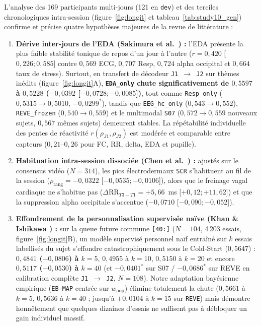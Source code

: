 \documentclass[10pt]{article}
\begin{document}
L'analyse des 169 participants multi-jours (121 en \texttt{dev}) et des terciles chronologiques intra-session (figure~\ref{fig:longit} et tableau~\ref{tab:study10_gen}) confirme et précise quatre hypothèses majeures de la revue de littérature :
\begin{enumerate}
\item \textbf{Dérive inter-jours de l'EDA (Sakimura et al.\ \cite{sakimura2025}) :} l'EDA présente la plus faible stabilité tonique de repos d'un jour à l'autre ($r = 0{,}420$ [$0{,}226 ; 0{,}585$] contre $0{,}569$ ECG, $0{,}707$ Resp, $0{,}724$ alpha occipital et $0{,}664$ taux de stress). Surtout, en transfert de décodeur \texttt{J1 $\to$ J2} sur thèmes inédits (figure~\ref{fig:longit}A), \textbf{\texttt{EDA\_only} chute significativement de $0{,}5597$ à $0{,}5228$ ($-0{,}0392$ [$-0{,}0728 ; -0{,}0085$])}, tout comme \texttt{Resp\_only} ($0{,}5315 \to 0{,}5010$, $-0{,}0299^*$), tandis que \texttt{EEG\_hc\_only} ($0{,}543 \to 0{,}552$), \texttt{REVE\_frozen} ($0{,}540 \to 0{,}559$) et le multimodal \texttt{S07} ($0{,}572 \to 0{,}559$ nouveaux sujets, $0{,}567$ mêmes sujets) demeurent stables. La répétabilité individuelle des pentes de réactivité $r(\rho_{J1}, \rho_{J2})$ est modérée et comparable entre capteurs ($0{,}21$--$0{,}26$ pour FC, RR, delta, EDA et pupille).
\item \textbf{Habituation intra-session dissociée (Chen et al.\ \cite{chen2014}) :} ajustés sur le consensus vidéo ($N = 314$), les pics électrodermaux \texttt{SCR} s'habituent au fil de la session ($\rho_{\text{rang}} = -0{,}0322$ [$-0{,}0535 ; -0{,}0106$]), alors que le freinage vagal cardiaque ne s'habitue pas ($\Delta\mathrm{RR}_{T3-T1} = +5{,}66$~ms [$+0{,}12 ; +11{,}62$]) et que la suppression alpha occipitale s'accentue ($-0{,}0710$ [$-0{,}090 ; -0{,}052$]).
\item \textbf{Effondrement de la personnalisation supervisée naïve (Khan \& Ishikawa \cite{khan2026}) :} sur la queue future commune \texttt{[40:]} ($N = 104$, 4\,203 essais, figure~\ref{fig:longit}B), un modèle supervisé personnel naïf entraîné sur $k$ essais labellisés du sujet s'effondre catastrophiquement sous le Cold-Start ($0{,}5647$) : \textbf{$0{,}4841$ ($-0{,}0806$) à $k = 5$}, $0{,}4955$ à $k = 10$, $0{,}5150$ à $k = 20$ et encore \textbf{$0{,}5117$ ($-0{,}0530$) à $k = 40$} (et $-0{,}0401^*$ sur S07 / $-0{,}0686^*$ sur REVE en calibration complète \texttt{J1 $\to$ J2}, $N = 108$). Notre adaptation bayésienne empirique (\texttt{EB-MAP} centrée sur $w_{\text{pop}}$) élimine totalement la chute ($0{,}5661$ à $k = 5$, $0{,}5636$ à $k = 40$ ; jusqu'à $+0{,}0104$ à $k = 15$ sur \texttt{REVE}) mais démontre honnêtement que quelques dizaines d'essais ne suffisent pas à débloquer un gain individuel massif.

\end{enumerate}
\end{document}
